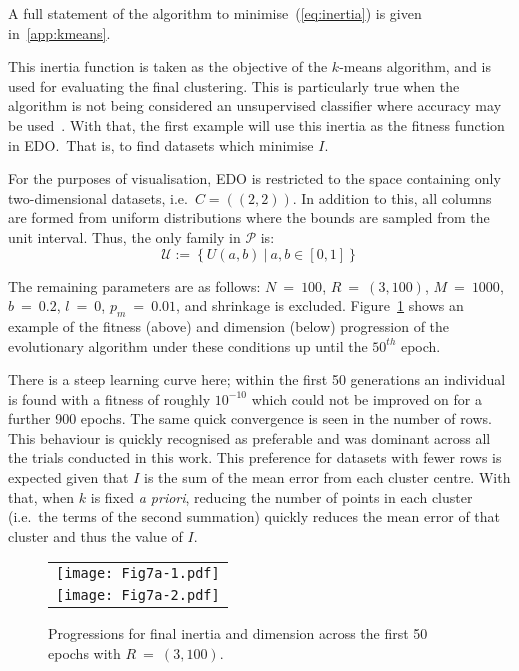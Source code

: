 A full statement of the algorithm to minimise~(\ref{eq:inertia}) is given
in~\ref{app:kmeans}.

This inertia function is taken as the objective of the \(k\)-means algorithm,
and is used for evaluating the final clustering. This is particularly true when
the algorithm is not being considered an unsupervised classifier where accuracy
may be used~\cite{Huang1998}. With that, the first example will use this inertia
as the fitness function in EDO.\ That is, to find datasets which minimise \(I\).

For the purposes of visualisation, EDO is restricted to the space containing
only two-dimensional datasets, i.e.\ \(C = \left((2, 2)\right)\). In addition to
this, all columns are formed from uniform distributions where the bounds are
sampled from the unit interval. Thus, the only family in \(\mathcal{P}\) is:
\begin{equation}
    \mathcal{U} := \left\{U(a, b)~|~a, b \in [0, 1]\right\}
\end{equation}

The remaining parameters are as follows: \(N~=~100\), \(R~=~(3, 100)\),
\(M~=~1000\), \(b~=~0.2\), \(l~=~0\), \(p_m~=~0.01\), and shrinkage is excluded.
Figure~\ref{fig:small-inertia-50} shows an example of the fitness (above) and
dimension (below) progression of the evolutionary algorithm under these
conditions up until the \(50^{th}\) epoch.

There is a steep learning curve here; within the first 50 generations an
individual is found with a fitness of roughly \(10^{-10}\) which could not be
improved on for a further 900 epochs. The same quick convergence is seen in the
number of rows. This behaviour is quickly recognised as preferable and was
dominant across all the trials conducted in this work. This preference for
datasets with fewer rows is expected given that \(I\) is the sum of the mean
error from each cluster centre. With that, when \(k\) is fixed \textit{a
priori}, reducing the number of points in each cluster (i.e.\ the terms of the
second summation) quickly reduces the mean error of that cluster and thus the
value of \(I\).

\begin{figure}[htbp]
    \centering
    \begin{tabular}{c}
        \texttt{[image: Fig7a-1.pdf]}
        \\
        \texttt{[image: Fig7a-2.pdf]}
    \end{tabular}
    \caption{%
        Progressions for final inertia and dimension across the first 50
        epochs with \(R~=~(3,100)\).
    }\label{fig:small-inertia-50}
\end{figure}

